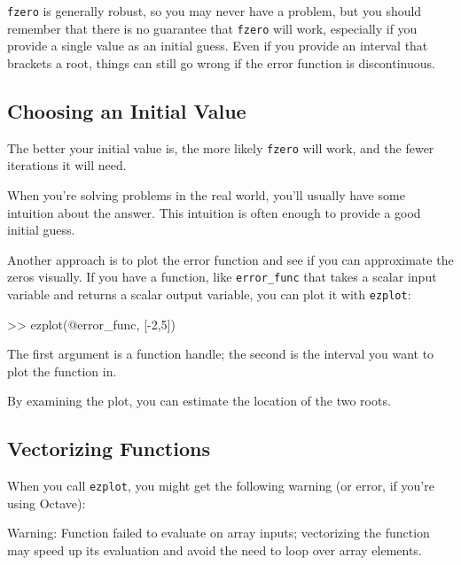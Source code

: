{\tt fzero} is generally robust, so you may never have a problem, but you should remember that there is no guarantee that {\tt fzero} will work, especially if you provide a single value as an initial guess.  Even if you provide an interval that brackets a root, things can still go wrong if the error function is discontinuous.


\subsection{Choosing an Initial Value}

The better your initial value is, the more likely
{\tt fzero} will work, and the fewer iterations it will
need.

When you're solving problems in the real world, you'll usually
have some intuition about the answer.  This intuition is often enough
to provide a good initial guess.


Another approach is to plot the error function and see if you can
approximate the zeros visually.  If you have a function, like
\verb"error_func" that takes a scalar input variable and returns
a scalar output variable, you can plot it with {\tt ezplot}:

\begin{code}
>> ezplot(@error_func, [-2,5])
\end{code}


The first argument is a function handle; the second is the interval you want to plot the function in.

By examining the plot, you can estimate the location of the two roots.


\subsection{Vectorizing Functions}


When you call {\tt ezplot}, you might get the following warning (or error, if you're using Octave):

\begin{code}
Warning: Function failed to evaluate on array inputs;
vectorizing the function may speed up its evaluation and 
avoid the need to loop over array elements. 
\end{code}

